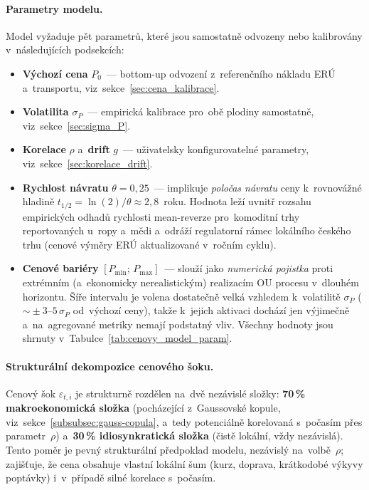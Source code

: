 \paragraph{Parametry modelu.}
Model vyžaduje pět parametrů, které jsou samostatně odvozeny
nebo kalibrovány v~následujících podsekcích:
\begin{itemize}
    \item \textbf{Výchozí cena} $P_0$~--- bottom-up odvození
          z~referenčního nákladu ERÚ a~transportu, viz~sekce~\ref{sec:cena_kalibrace}.
    \item \textbf{Volatilita} $\sigma_P$~--- empirická kalibrace
          pro~obě plodiny samostatně, viz~sekce~\ref{sec:sigma_P}.
    \item \textbf{Korelace} $\rho$ a~\textbf{drift} $g$~--- uživatelsky
          konfigurovatelné parametry, viz~sekce~\ref{sec:korelace_drift}.
\item \textbf{Rychlost návratu} $\theta = 0{,}25$~--- implikuje
      \emph{poločas návratu} ceny k~rovnovážné hladině
      $t_{1/2} = \ln(2)/\theta \approx 2{,}8$~roku. Hodnota leží
      uvnitř rozsahu empirických odhadů rychlosti mean-reverze
      pro~komoditní trhy reportovaných u~ropy a~mědi
      \citep{Schwartz1997} a~odráží regulatorní rámec lokálního
      českého trhu (cenové výměry ERÚ aktualizované v~ročním cyklu).
\item \textbf{Cenové bariéry} $[P_{\min};\, P_{\max}]$~--- slouží jako
      \textit{numerická pojistka} proti extrémním (a~ekonomicky
      nerealistickým) realizacím OU procesu v~dlouhém horizontu.
      Šíře intervalu je volena dostatečně velká vzhledem k~volatilitě
      $\sigma_P$ ($\sim\!\pm 3$--$5\,\sigma_P$ od~výchozí ceny),
      takže k~jejich aktivaci dochází jen výjimečně a~na~agregované
      metriky nemají podstatný vliv. Všechny hodnoty jsou shrnuty
      v~Tabulce~\ref{tab:cenovy_model_param}.
\end{itemize}

\paragraph{Strukturální dekompozice cenového šoku.}
Cenový šok $\varepsilon_{t,i}$ je strukturně rozdělen na~dvě nezávislé
složky: \textbf{70\,\% makroekonomická složka} (pocházející z~Gaussovské
kopule, viz~sekce~\ref{subsubsec:gauss-copula}, a~tedy potenciálně
korelovaná s~počasím přes parametr~$\rho$) a~\textbf{30\,\%
idiosynkratická složka} (čistě lokální, vždy nezávislá). Tento poměr
je pevný strukturální předpoklad modelu, nezávislý na~volbě~$\rho$;
zajišťuje, že cena obsahuje vlastní lokální šum (kurz, doprava,
krátkodobé výkyvy poptávky) i~v~případě silné korelace s~počasím.


